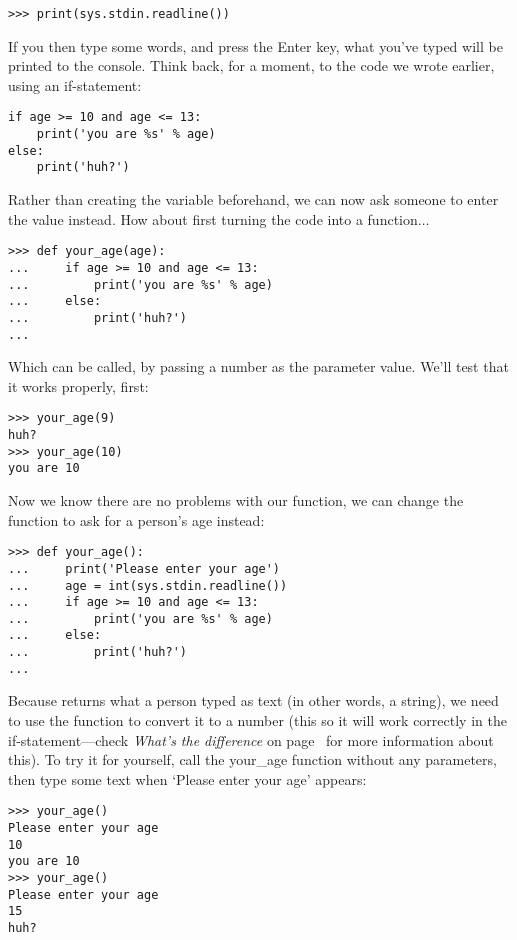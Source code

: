 \begin{Verbatim}[frame=single]
>>> print(sys.stdin.readline())
\end{Verbatim}

If you then type some words, and press the Enter key, what you've typed will be printed to the console. Think back, for a moment, to the code we wrote earlier, using an if-statement:

\begin{Verbatim}[frame=single]
if age >= 10 and age <= 13:
    print('you are %s' % age)
else:
    print('huh?')
\end{Verbatim}

Rather than creating the variable  beforehand, we can now ask someone to enter the value instead.  How about first turning the code into a function$\ldots$

\begin{Verbatim}[frame=single]
>>> def your_age(age):
...     if age >= 10 and age <= 13:
...         print('you are %s' % age)
...     else:
...         print('huh?')
...
\end{Verbatim}

Which can be called, by passing a number as the parameter value.  We'll test that it works properly, first:

\begin{Verbatim}[frame=single]
>>> your_age(9)
huh?
>>> your_age(10)
you are 10
\end{Verbatim}

Now we know there are no problems with our function, we can change the function to ask for a person's age instead:

\begin{Verbatim}[frame=single]
>>> def your_age():
...     print('Please enter your age')
...     age = int(sys.stdin.readline())
...     if age >= 10 and age <= 13:
...         print('you are %s' % age)
...     else:
...         print('huh?')
...
\end{Verbatim}

Because  returns what a person typed as text (in other words, a string), we need to use the function  to convert it to a number (this so it will work correctly in the if-statement---check \emph{What's the difference} on page~\pageref{whatsthedifference} for more information about this).  To try it for yourself, call the your\_age function without any parameters, then type some text when `Please enter your age' appears:

\begin{Verbatim}[frame=single]
>>> your_age()
Please enter your age
10
you are 10
>>> your_age()
Please enter your age
15
huh?
\end{Verbatim}

